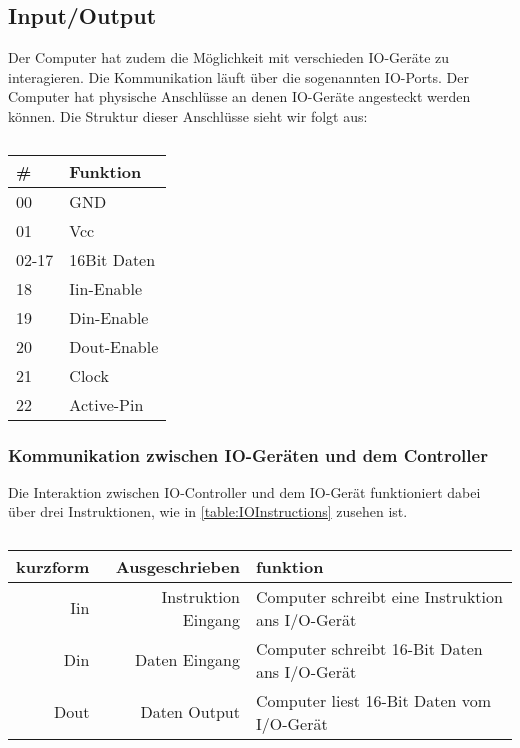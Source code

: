 \documentclass{scrartcl}
\begin{document}
\subsection{\label{section:io}Input/Output}

Der Computer hat zudem die Möglichkeit mit verschieden IO-Geräte zu interagieren.
Die Kommunikation läuft über die sogenannten IO-Ports.
Der Computer hat physische Anschlüsse an denen IO-Geräte angesteckt werden können.
Die Struktur dieser Anschlüsse sieht wir folgt aus:

\begin{center}
	\begin{table}[h]
		\caption{\label{table:IOPins}}
		\begin{tabular}{l | l}
			\# & Funktion \\
			\hline
			00 & GND \\
			01 & Vcc \\
			02-17 & 16Bit Daten \\
			18 & Iin-Enable \\
			19 & Din-Enable \\
			20 & Dout-Enable \\
			21 & Clock \\
			22 & Active-Pin
 		\end{tabular}
	\end{table}
\end{center}



\subsubsection{\label{section:IO-Port}Kommunikation zwischen IO-Geräten und dem Controller}
Die Interaktion zwischen IO-Controller und dem IO-Gerät funktioniert dabei über drei Instruktionen, wie in \autoref{table:IOInstructions} zusehen ist.

\begin{center}
	\begin{table}[h]
		\caption{\label{table:IOInstructions}}
		\begin{tabular}{r | r | l}
			kurzform & Ausgeschrieben & funktion \\
			\hline
			Iin & Instruktion Eingang & Computer schreibt eine Instruktion ans I/O-Gerät \\
			Din & Daten Eingang & Computer schreibt 16-Bit Daten ans I/O-Gerät \\
			Dout &  Daten Output & Computer liest 16-Bit Daten vom I/O-Gerät
 		\end{tabular}
	\end{table}
\end{center}
\end{document}
